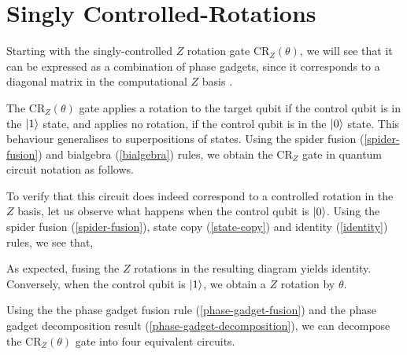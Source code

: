 \section{Singly Controlled-Rotations}

Starting with the singly-controlled $Z$ rotation gate CR$_Z(\theta)$, we will see that it can be expressed as a combination of phase gadgets, since it corresponds to a diagonal matrix in the computational $Z$ basis \cite{Yeung2020}.


The CR$_Z(\theta)$ gate applies a rotation to the target qubit if the control qubit is in the $\ket 1$ state, and applies no rotation, if the control qubit is in the $\ket 0$ state. This behaviour generalises to superpositions of states. Using the spider fusion (\ref{spider-fusion}) and bialgebra (\ref{bialgebra}) rules, we obtain the CR$_Z$ gate in quantum circuit notation as follows.


To verify that this circuit does indeed correspond to a controlled rotation in the $Z$ basis, let us observe what happens when the control qubit is $\ket 0$. Using the spider fusion (\ref{spider-fusion}), state copy (\ref{state-copy}) and identity (\ref{identity}) rules, we see that,


As expected, fusing the $Z$ rotations in the resulting diagram yields identity. Conversely, when the control qubit is $\ket 1$, we obtain a $Z$ rotation by $\theta$.


Using the the phase gadget fusion rule (\ref{phase-gadget-fusion}) and the phase gadget decomposition result (\ref{phase-gadget-decomposition}), we can decompose the CR$_Z(\theta)$ gate into four equivalent circuits.

